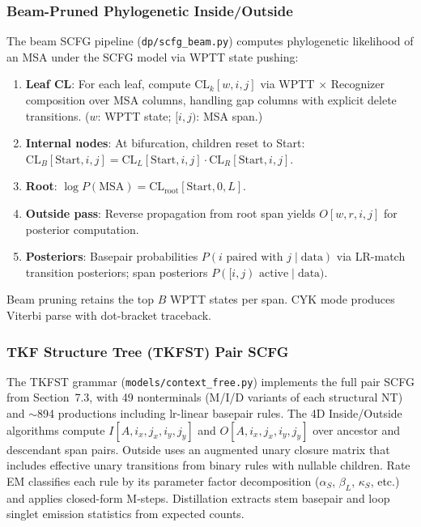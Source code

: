 \subsubsection{Beam-Pruned Phylogenetic Inside/Outside}
The beam SCFG pipeline (\texttt{dp/scfg\_beam.py}) computes phylogenetic likelihood
of an MSA under the SCFG model via WPTT state pushing:
\begin{enumerate}
\item \textbf{Leaf CL}: For each leaf, compute $\mathrm{CL}_k[w, i, j]$
  via WPTT $\times$ Recognizer composition over MSA columns, handling gap
  columns with explicit delete transitions. ($w$: WPTT state; $[i,j)$: MSA span.)
\item \textbf{Internal nodes}: At bifurcation, children reset to Start:
  $\mathrm{CL}_B[\text{Start}, i, j] = \mathrm{CL}_L[\text{Start}, i, j] \cdot \mathrm{CL}_R[\text{Start}, i, j]$.
\item \textbf{Root}: $\log P(\text{MSA}) = \mathrm{CL}_{\text{root}}[\text{Start}, 0, L]$.
\item \textbf{Outside pass}: Reverse propagation from root span yields
  $O[w, r, i, j]$ for posterior computation.
\item \textbf{Posteriors}: Basepair probabilities
  $P(i \text{ paired with } j \mid \text{data})$ via LR-match transition
  posteriors; span posteriors $P([i,j) \text{ active} \mid \text{data})$.
\end{enumerate}
Beam pruning retains the top $B$ WPTT states per span.
CYK mode produces Viterbi parse with dot-bracket traceback.

\subsubsection{TKF Structure Tree (TKFST) Pair SCFG}
The TKFST grammar (\texttt{models/context\_free.py}) implements the full pair SCFG
from Section~7.3, with 49 nonterminals (M/I/D variants of each structural NT)
and $\sim$894 productions including lr-linear basepair rules.
The 4D Inside/Outside algorithms compute $I[A, i_x, j_x, i_y, j_y]$ and
$O[A, i_x, j_x, i_y, j_y]$ over ancestor and descendant span pairs.
Outside uses an augmented unary closure matrix that includes effective unary
transitions from binary rules with nullable children.
Rate EM classifies each rule by its parameter factor decomposition
($\alpha_S$, $\beta_L$, $\kappa_S$, etc.) and applies closed-form M-steps.
Distillation extracts stem basepair and loop singlet emission statistics
from expected counts.

